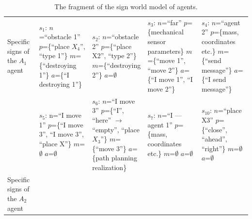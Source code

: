 \documentclass[runningheads,a4paper]{llncs}
\begin{document}
\setlength{\tabcolsep}{5pt}
\renewcommand{\arraystretch}{1.5}
\begin{table}\tiny
	\caption{The fragment of the sign world model of agents.}	
	\label{tab:world}
	\begin{tabular}{| p{1.5cm} | p{2.2cm} | p{2.2cm} | p{2.2cm} | p{2.2cm} |}
		\hline
		Specific signs of the $A_1$ agent
		&
		$s_1$: $n$=``obstacle 1''\newline
		$p$=\{``place $X_4$'', ``type 1''\}\newline
		$m$=\{``destroying 1''\}\newline
		$a$=\{``I destroying 1''\}
		&
		$s_2$: $n$=``obstacle 2''\newline
		$p$=\{``place X2'', ``type 2''\}\newline
		$m$=\{``destroying 2''\}\newline
		$a$=$\emptyset$
		&
		$s_3$: $n$=``far''\newline
		$p$=\{mechanical sensor parameters\}\newline
		$m$=\{``move 1'', ``move 2''\}\newline
		$a$=\{``I move 1'', ``I move 2''\}
		&
		$s_4$: $n$=``agent 2''\newline
		$p$=\{mass, coordinates etc.\}\newline
		$m$=\{``send message''\}\newline
		$a$=\{``I send message''\}
		\\\cline{2-5}
		&
		$s_5$: n=``I move 1''\newline
		$p$=\{``I move 3'', ``I move 3'', ``place X''\}\newline
		$m$=$\emptyset$\newline
		$a$=$\emptyset$	
		&
		$s_6$: $n$=``I move 3''\newline
		$p$=\{``I'', ``here'' $\rightarrow$ ``empty'', ``place $X_3$''\}\newline
		$m$=\{``move 3''\}\newline
		$a$=\{path planning realization\}
		&
		$s_7$: $n$=``I --- agent 1''\newline
		$p$=\{mass, coordinates etc.\}\newline
		$m$=$\emptyset$\newline
		$a$=$\emptyset$	
		&
		$s_{10}$: $n$=``place X3''\newline
		$p$=\{``close'', ``ahead'', ``right''\}\newline
		$m$=$\emptyset$\newline
		$a$=$\emptyset$
		\\ \hline
		Specific signs of the $A_2$ agent

\end{tabular}
\end{table}
\end{document}
